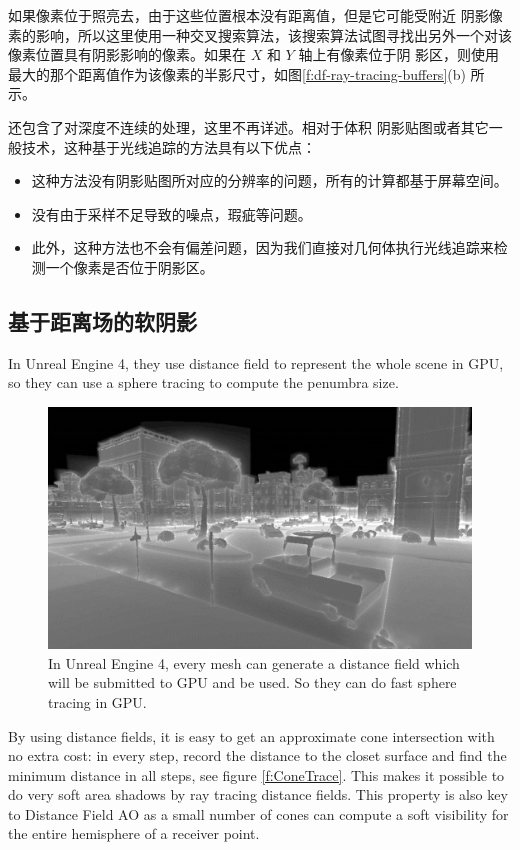 如果像素位于照亮去，由于这些位置根本没有距离值，但是它可能受附近 阴影像素的影响，所以这里使用一种交叉搜索算法，该搜索算法试图寻找出另外一个对该像素位置具有阴影影响的像素。如果在 $X$ 和 $Y$ 轴上有像素位于阴 影区，则使用最大的那个距离值作为该像素的半影尺寸，如图\ref{f:df-ray-tracing-buffers}(b) 所示。

\cite{a:Implementingfastraytracedsoftshadowsinagameengine}还包含了对深度不连续的处理，这里不再详述。相对于体积 阴影贴图或者其它一般技术，这种基于光线追踪的方法具有以下优点：

\begin{itemize}
	\item 这种方法没有阴影贴图所对应的分辨率的问题，所有的计算都基于屏幕空间。
	\item 没有由于采样不足导致的噪点，瑕疵等问题。
	\item 此外，这种方法也不会有偏差问题，因为我们直接对几何体执行光线追踪来检测一个像素是否位于阴影区。
\end{itemize}



\subsection{基于距离场的软阴影}
In Unreal Engine 4, they use distance field to represent the whole scene in GPU, so they can use a sphere tracing to compute the penumbra size.

\begin{figure}
	\includegraphics{graphics/shadows/VisualizeMeshDistanceFields}
	\caption{In Unreal Engine 4, every mesh can generate a distance field which will be submitted to GPU and be used. So they can do fast sphere tracing in GPU.}
\end{figure}

By using distance fields, it is easy to get an approximate cone intersection with no extra cost: in every step, record the distance to the closet surface and find the minimum distance in all steps, see figure \ref{f:ConeTrace}. This makes it possible to do very soft area shadows by ray tracing distance fields. This property is also key to Distance Field AO as a small number of cones can compute a soft visibility for the entire hemisphere of a receiver point.

